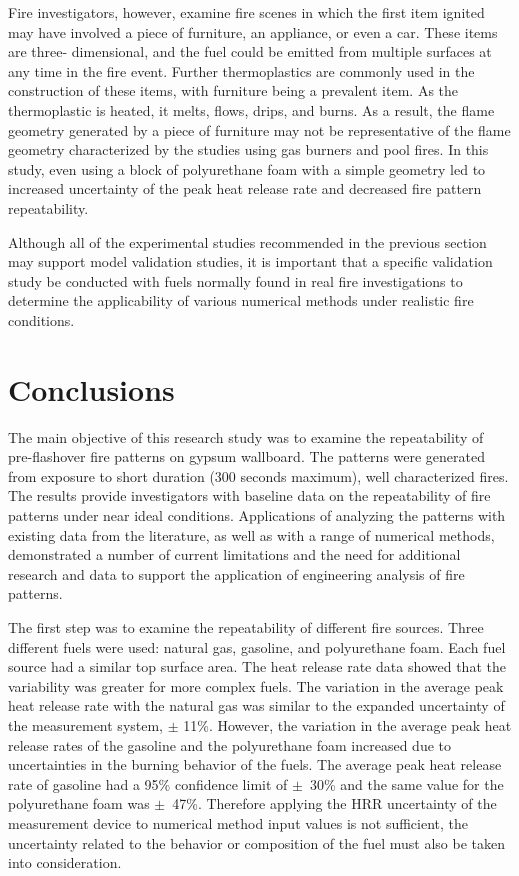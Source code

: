 \documentclass[twoside]{uocthesis}
\begin{document}
{Fire investigators, however, examine fire scenes in which the first item ignited may have involved a piece of furniture, an appliance, or even a car.   These items are three- dimensional, and the fuel could be emitted from multiple surfaces at any time in the fire event.  Further thermoplastics are commonly used in the construction of these items, with furniture being a prevalent item.  As the thermoplastic is heated, it melts, flows, drips, and burns.   As a result, the flame geometry generated by a piece of furniture may not be representative of the flame geometry characterized by the studies using gas burners and pool fires.  In this study, even using a block of polyurethane foam with a simple geometry led to increased uncertainty of the peak heat release rate and decreased fire pattern repeatability.  

Although all of the experimental studies recommended in the previous section may support model validation studies, it is important that a specific validation study be conducted with fuels normally found in real fire investigations to determine the applicability of various numerical methods under realistic fire conditions. 

\chapter{Conclusions}

The main objective of this research study was to examine the repeatability of pre-flashover fire patterns on gypsum wallboard.  The patterns were generated from exposure to short duration (300 seconds maximum), well characterized fires.  The results provide investigators with baseline data on the repeatability of fire patterns under near ideal conditions.  Applications of analyzing the patterns with existing data from the literature, as well as with a range of numerical methods, demonstrated a number of current limitations and the need for additional research and data to support the application of engineering analysis of fire patterns.     

The first step was to examine the repeatability of different fire sources.  Three different fuels were used: natural gas, gasoline, and polyurethane foam.  Each fuel source had a similar top surface area.  The heat release rate data showed that the variability was greater for more complex fuels.  The variation in the average peak heat release rate with the natural gas was similar to the expanded uncertainty of the measurement system, $\pm$ 11\%.  However, the variation in the average peak heat release rates of the gasoline and the polyurethane foam increased due to uncertainties in the burning behavior of the fuels.  The average peak heat release rate of gasoline had a 95\% confidence limit of $\pm$~30\% and the same value for the polyurethane foam was $\pm$~47\%.  Therefore applying the HRR uncertainty of the measurement device to numerical method input values is not sufficient, the uncertainty related to the behavior or composition of the fuel must also be taken into consideration. 

}
\end{document}
